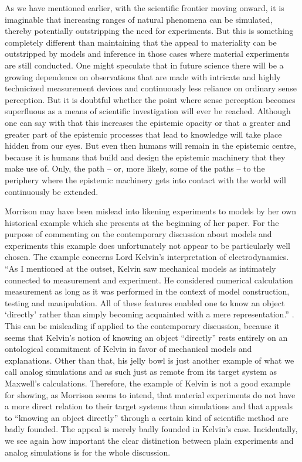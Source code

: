 \documentclass[12pt, a4paper]{article}
\numberwithin{equation}{section}
\begin{document}
As we have mentioned earlier, with the scientific frontier moving onward, it is imaginable that increasing ranges of natural phenomena can be simulated, thereby potentially outstripping the need for experiments. But this is something completely different than maintaining that the appeal to materiality can be outstripped by models and inference in those cases where material experiments are still conducted. One might speculate that in future science there will be a growing dependence on observations that are made with intricate and highly technicized measurement devices and continuously less reliance on ordinary sense perception. But it is doubtful whether the point where sense perception becomes superfluous as a means of scientific investigation will ever be reached. Although one can say with \cite{humphreys:2004} that this increases the epistemic opacity or that a greater and greater part of the epistemic processes that lead to knowledge will take place hidden from our eyes. But even then humans will remain in the epistemic centre, because it is humans that build and design the epistemic machinery that they make use of. Only, the path -- or, more likely, some of the paths -- to the periphery where the epistemic machinery gets into contact with the world will continuously be extended.

Morrison may have been mislead into likening experiments to models by her own historical example which she presents at the beginning of her paper. For the purpose of commenting on the contemporary discussion about models and experiments this example does unfortunately not appear to be particularly well chosen. The example concerns Lord Kelvin's interpretation of electrodynamics. ``As I mentioned at the outset, Kelvin saw mechanical models as intimately connected to measurement and experiment. He considered numerical calculation measurement as long as it was performed in the context of model construction, testing and manipulation. All of these features enabled one to know an object ‘directly’ rather than simply becoming acquainted with a mere representation.'' \cite[p.\ 30]{morrison:2009}. This can be misleading if applied to the contemporary discussion, because it seems that Kelvin's notion of knowing an object ``directly'' rests entirely on an ontological commitment of Kelvin in favor of mechanical models and explanations. Other than that, his jelly bowl \citep[p.\ 37]{morrison:2009} is just another example of what we call analog simulations and as such just as remote from its target system as Maxwell's calculations. Therefore, the example of Kelvin is not a good example for showing, as Morrison seems to intend, that material experiments do not have a more direct relation to their target systems than simulations and that appeals to ``knowing an object directly'' through a certain kind of scientific method are badly founded. The appeal is merely badly founded in Kelvin's case. Incidentally, we see again how important the clear distinction between plain experiments and analog simulations is for the whole discussion.
\end{document}
